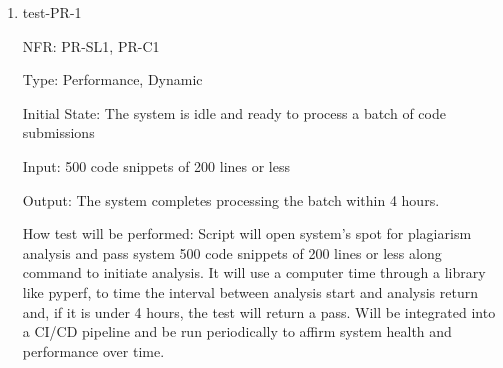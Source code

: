 \documentclass[12pt, titlepage]{article}
\begin{document}
\begin{enumerate}
  \item{test-PR-1}
  
  NFR: PR-SL1, PR-C1

  Type: Performance, Dynamic

  Initial State: The system is idle and ready to process a batch of code submissions

  Input: 500 code snippets of 200 lines or less 

  Output: The system completes processing the batch within 4 hours.

  How test will be performed: Script will open system's spot for plagiarism analysis 
  and pass system 500 code snippets of 200 lines or less along command to initiate analysis. 
  It will use a computer time through a library like pyperf, to time the interval between 
  analysis start and analysis return and, if it is under 4 hours, the test will return a pass. 
  Will be integrated into a CI/CD pipeline and be run periodically to affirm system health and 
  performance over time.

\end{enumerate}
\end{document}
